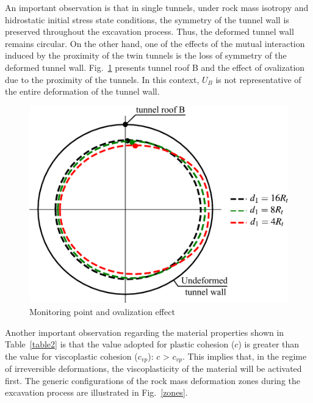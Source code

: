 \documentclass[a4paper,fleqn]{cas-sc}
\begin{document}
An important observation is that in single tunnels, under rock mass isotropy and hidrostatic initial stress state conditions, the symmetry of the tunnel wall is preserved throughout the excavation process. Thus, the deformed tunnel wall remains circular. On the other hand, one of the effects of the mutual interaction induced by the proximity of the twin tunnels is the loss of symmetry of the deformed tunnel wall. Fig.~\ref{Ovalization effect and monitoring point} presents tunnel roof B and the effect of ovalization due to the proximity of the tunnels. In this context, $U_B$ is not representative of the entire deformation of the tunnel wall.
\begin{figure}[h!]
	\centering
	\includegraphics[scale=0.5]{Ovalization effect and monitoring point.pdf}
	\caption{Monitoring point and ovalization effect}
	\label{Ovalization effect and monitoring point}
\end{figure}
\FloatBarrier

Another important observation regarding the material properties shown in Table~\ref{table2} is that the value adopted for plastic cohesion ($c$) is greater than the value for viscoplastic cohesion ($c_{vp}$): $c$ > $c_{vp}$. This implies that, in the regime of irreversible deformations, the viscoplasticity of the material will be activated first. The generic configurations of the rock mass deformation zones during the excavation process are illustrated in Fig.~\ref{zones}.
\end{document}
